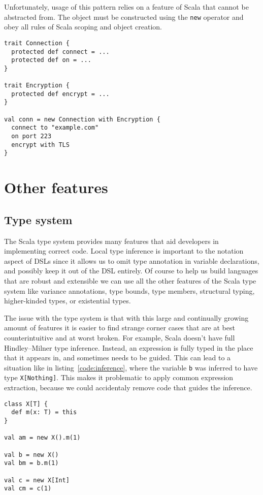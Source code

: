 Unfortunately, usage of this pattern relies on a feature of Scala that cannot be abstracted from. The object must be constructed using the \texttt{new} operator and obey all rules of Scala scoping and object creation.

\begin{lstlisting}[caption=Anonymous classes, label=code:anonymous]
trait Connection {
  protected def connect = ...
  protected def on = ...
}

trait Encryption {
  protected def encrypt = ...
}

val conn = new Connection with Encryption {
  connect to "example.com"
  on port 223
  encrypt with TLS
}
\end{lstlisting}

\section{Other features}

\subsection{Type system}

The Scala type system provides many features that aid developers in implementing correct code. Local type inference is important to the notation aspect of DSLs since it allows us to omit type annotation in variable declarations, and possibly keep it out of the DSL entirely. Of course to help us build languages that are robust and extensible we can use all the other features of the Scala type system like variance annotations, type bounds, type members, structural typing, higher-kinded types, or existential types.

The issue with the type system is that with this large and continually growing amount of features it is easier to find strange corner cases that are at best counterintuitive and at worst broken. For example, Scala doesn't have full Hindley–Milner type inference. Instead, an expression is fully typed in the place that it appears in, and sometimes needs to be guided. This can lead to a situation like in listing~\ref{code:inference}, where the variable \texttt{b} was inferred to have type \texttt{X[Nothing]}. This makes it problematic to apply common expression extraction, because we could accidentaly remove code that guides the inference.

\begin{lstlisting}[caption=Local inference, label=code:inference]
class X[T] {
  def m(x: T) = this
}

val am = new X().m(1)

val b = new X()
val bm = b.m(1)

val c = new X[Int]
val cm = c(1)
\end{lstlisting}

